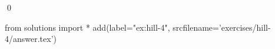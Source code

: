 
\begin{ex} 
  \label{ex:hill-4}
  
  \qed
\end{ex} 
\begin{python0}
from solutions import *
add(label="ex:hill-4",
    srcfilename='exercises/hill-4/answer.tex') 
\end{python0}
